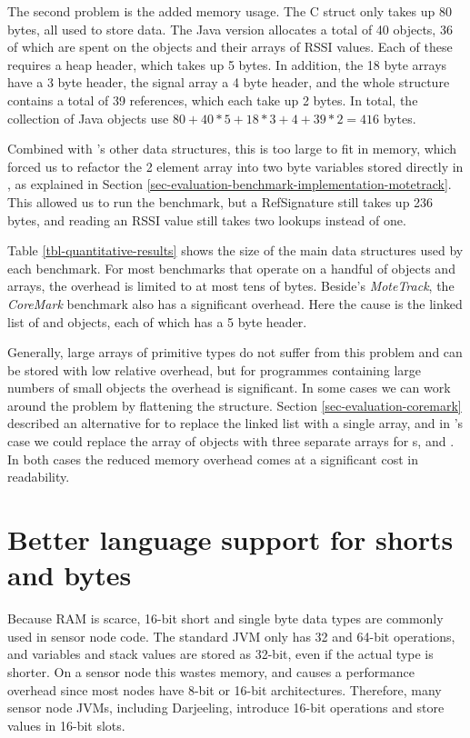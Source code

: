 The second problem is the added memory usage. The C struct only takes up 80 bytes, all used to store data. The Java version allocates a total of 40 objects, 36 of which are spent on the  objects and their arrays of RSSI values. Each of these requires a heap header, which takes up 5 bytes. In addition, the 18 byte arrays have a 3 byte header, the signal array a 4 byte header, and the whole structure contains a total of 39 references, which each take up 2 bytes. In total, the collection of Java objects use $80 + 40*5 + 18*3 + 4 + 39*2 = 416$ bytes.

Combined with 's other data structures, this is too large to fit in memory, which forced us to refactor the 2 element  array into two byte variables stored directly in , as explained in Section \ref{sec-evaluation-benchmark-implementation-motetrack}. This allowed us to run the benchmark, but a RefSignature still takes up 236 bytes, and reading an RSSI value still takes two lookups instead of one.

Table \ref{tbl-quantitative-results} shows the size of the main data structures used by each benchmark. For most benchmarks that operate on a handful of objects and arrays, the overhead is limited to at most tens of bytes. Beside's \emph{MoteTrack}, the \emph{CoreMark} benchmark also has a significant overhead. Here the cause is the linked list of  and  objects, each of which has a 5 byte header.

Generally, large arrays of primitive types do not suffer from this problem and can be stored with low relative overhead, but for programmes containing large numbers of small objects the overhead is significant. In some cases we can work around the problem by flattening the structure. Section \ref{sec-evaluation-coremark} described an alternative for  to replace the linked list with a single array, and in 's case we could replace the array of  objects with three separate arrays for s,  and . In both cases the reduced memory overhead comes at a significant cost in readability.




\section{Better language support for shorts and bytes}
\label{sec-small-datatypes}
Because RAM is scarce, 16-bit short and single byte data types are commonly used in sensor node code. The standard JVM only has 32 and 64-bit operations, and variables and stack values are stored as 32-bit, even if the actual type is shorter. On a sensor node this wastes memory, and causes a performance overhead since most nodes have 8-bit or 16-bit architectures. Therefore, many sensor node JVMs, including Darjeeling, introduce 16-bit operations and store values in 16-bit slots.

